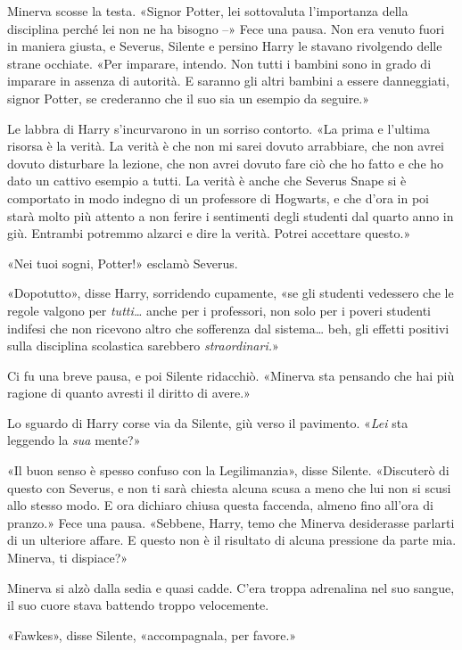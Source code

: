 Minerva scosse la testa. «Signor Potter, lei sottovaluta l’importanza della disciplina perché lei non ne ha bisogno –» Fece una pausa. Non era venuto fuori in maniera giusta, e Severus, Silente e persino Harry le stavano rivolgendo delle strane occhiate. «Per imparare, intendo. Non tutti i bambini sono in grado di imparare in assenza di autorità. E saranno gli altri bambini a essere danneggiati, signor Potter, se crederanno che il suo sia un esempio da seguire.»

Le labbra di Harry s’incurvarono in un sorriso contorto. «La prima e l’ultima risorsa è la verità. La verità è che non mi sarei dovuto arrabbiare, che non avrei dovuto disturbare la lezione, che non avrei dovuto fare ciò che ho fatto e che ho dato un cattivo esempio a tutti. La verità è anche che Severus Snape si è comportato in modo indegno di un professore di Hogwarts, e che d’ora in poi starà molto più attento a non ferire i sentimenti degli studenti dal quarto anno in giù. Entrambi potremmo alzarci e dire la verità. Potrei accettare questo.»

«Nei tuoi sogni, Potter!» esclamò Severus.

«Dopotutto», disse Harry, sorridendo cupamente, «se gli studenti vedessero che le regole valgono per \textit{tutti…} anche per i professori, non solo per i poveri studenti indifesi che non ricevono altro che sofferenza dal sistema… beh, gli effetti positivi sulla disciplina scolastica sarebbero \textit{straordinari.}»

Ci fu una breve pausa, e poi Silente ridacchiò. «Minerva sta pensando che hai più ragione di quanto avresti il diritto di avere.»

Lo sguardo di Harry corse via da Silente, giù verso il pavimento. «\textit{Lei} sta leggendo la \textit{sua} mente?»

«Il buon senso è spesso confuso con la Legilimanzia», disse Silente. «Discuterò di questo con Severus, e non ti sarà chiesta alcuna scusa a meno che lui non si scusi allo stesso modo. E ora dichiaro chiusa questa faccenda, almeno fino all’ora di pranzo.» Fece una pausa. «Sebbene, Harry, temo che Minerva desiderasse parlarti di un ulteriore affare. E questo non è il risultato di alcuna pressione da parte mia. Minerva, ti dispiace?»

Minerva si alzò dalla sedia e quasi cadde. C’era troppa adrenalina nel suo sangue, il suo cuore stava battendo troppo velocemente.

«Fawkes», disse Silente, «accompagnala, per favore.»

